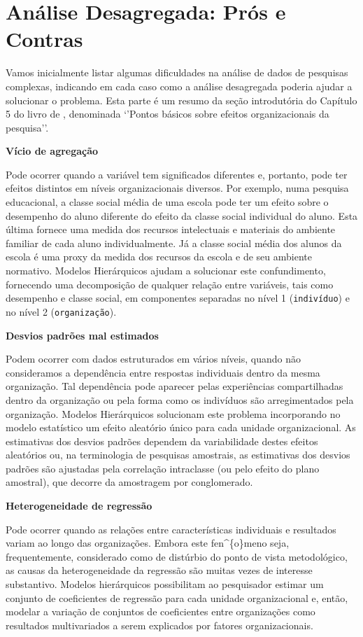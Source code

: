 \documentclass[]{book}
\numberwithin{example}{chapter}
\numberwithin{remark}{chapter}
\numberwithin{definition}{chapter}
\begin{document}
\section{Análise Desagregada: Prós e
Contras}\label{analise-desagregada-pros-e-contras}

Vamos inicialmente listar algumas dificuldades na análise de dados de
pesquisas complexas, indicando em cada caso como a análise desagregada
poderia ajudar a solucionar o problema. Esta parte é um resumo da seção
introdutória do Capítulo 5 do livro de \citep{bryk}, denominada `'Pontos
básicos sobre efeitos organizacionais da pesquisa''.

\textbf{Vício de agregação}

Pode ocorrer quando a variável tem significados diferentes e, portanto,
pode ter efeitos distintos em níveis organizacionais diversos. Por
exemplo, numa pesquisa educacional, a classe social média de uma escola
pode ter um efeito sobre o desempenho do aluno diferente do efeito da
classe social individual do aluno. Esta última fornece uma medida dos
recursos intelectuais e materiais do ambiente familiar de cada aluno
individualmente. Já a classe social média dos alunos da escola é uma
proxy da medida dos recursos da escola e de seu ambiente normativo.
Modelos Hierárquicos ajudam a solucionar este confundimento, fornecendo
uma decomposição de qualquer relação entre variáveis, tais como
desempenho e classe social, em componentes separadas no nível 1
(\texttt{indivíduo}) e no nível 2 (\texttt{organização}).

\textbf{Desvios padrões mal estimados}

Podem ocorrer com dados estruturados em vários níveis, quando não
consideramos a dependência entre respostas individuais dentro da mesma
organização. Tal dependência pode aparecer pelas experiências
compartilhadas dentro da organização ou pela forma como os indivíduos
são arregimentados pela organização. Modelos Hierárquicos solucionam
este problema incorporando no modelo estatístico um efeito aleatório
único para cada unidade organizacional. As estimativas dos desvios
padrões dependem da variabilidade destes efeitos aleatórios ou, na
terminologia de pesquisas amostrais, as estimativas dos desvios padrões
são ajustadas pela correlação intraclasse (ou pelo efeito do plano
amostral), que decorre da amostragem por conglomerado.

\textbf{Heterogeneidade de regressão}

Pode ocorrer quando as relações entre características individuais e
resultados variam ao longo das organizações. Embora este
fen\^{}\{o\}meno seja, frequentemente, considerado como de distúrbio do
ponto de vista metodológico, as causas da heterogeneidade da regressão
são muitas vezes de interesse substantivo. Modelos hierárquicos
possibilitam ao pesquisador estimar um conjunto de coeficientes de
regressão para cada unidade organizacional e, então, modelar a variação
de conjuntos de coeficientes entre organizações como resultados
multivariados a serem explicados por fatores organizacionais.
\end{document}
